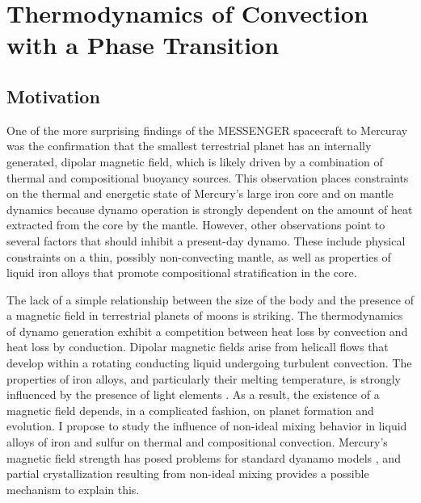 \chapter{Thermodynamics of Convection with a Phase Transition}\label{chap3}


\section{Motivation}

One of the more surprising findings of the MESSENGER spacecraft to Mercuray was
the confirmation that the smallest terrestrial planet has an internally
generated, dipolar magnetic field, which is likely driven by a combination of
thermal and compositional buoyancy sources. This observation places constraints
on the thermal and energetic state of Mercury’s large iron core and on mantle
dynamics because dynamo operation is strongly dependent on the amount of heat
extracted from the core by the mantle. However, other observations point to
several factors that should inhibit a present-day dynamo. These include
physical constraints on a thin, possibly non-convecting mantle, as well as
properties of liquid iron alloys that promote compositional stratification in
the core.

The lack of a simple relationship between the size of the body and the presence
of a magnetic field in terrestrial planets of moons is striking. The
thermodynamics of dynamo generation exhibit a competition between heat loss by
convection and heat loss by conduction.  Dipolar magnetic fields arise from
helicall flows that develop within a rotating conducting liquid undergoing
turbulent convection. The properties of iron alloys, and particularly their
melting temperature, is strongly influenced by the presence of light elements
\cite{sanloup2000}. As a result, the existence of a magnetic field depends, in a
complicated fashion, on planet formation and evolution. I propose to study the
influence of non-ideal mixing behavior in liquid alloys of iron and sulfur on
thermal and compositional convection. Mercury's magnetic field strength has
posed problems for standard dyanamo models \cite{Christensen2006,Stanley2005}, and
partial crystallization resulting from non-ideal mixing provides a possible
mechanism to explain this.

